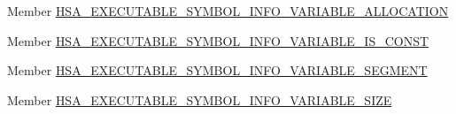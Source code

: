 \begin{DoxyRefList}
\item[Member \mbox{\hyperlink{group__executable_gga27e2e3a930764e3e7385e1ceded09706a7321c11fe73af65d09ef2718de8d1068}{HSA\+\_\+\+EXECUTABLE\+\_\+\+SYMBOL\+\_\+\+INFO\+\_\+\+VARIABLE\+\_\+\+ALLOCATION}} ]\label{deprecated__deprecated000084}%
%
 
\item[Member \mbox{\hyperlink{group__executable_gga27e2e3a930764e3e7385e1ceded09706a966dac196eeca9f48f1554c5f60b410d}{HSA\+\_\+\+EXECUTABLE\+\_\+\+SYMBOL\+\_\+\+INFO\+\_\+\+VARIABLE\+\_\+\+IS\+\_\+\+CONST}} ]\label{deprecated__deprecated000088}%
%
 
\item[Member \mbox{\hyperlink{group__executable_gga27e2e3a930764e3e7385e1ceded09706aa08f904d38d9ae932e16554353f40385}{HSA\+\_\+\+EXECUTABLE\+\_\+\+SYMBOL\+\_\+\+INFO\+\_\+\+VARIABLE\+\_\+\+SEGMENT}} ]\label{deprecated__deprecated000085}%
%
 
\item[Member \mbox{\hyperlink{group__executable_gga27e2e3a930764e3e7385e1ceded09706a060eddd4211e1537c84c26a3efabddb0}{HSA\+\_\+\+EXECUTABLE\+\_\+\+SYMBOL\+\_\+\+INFO\+\_\+\+VARIABLE\+\_\+\+SIZE}} ]\label{deprecated__deprecated000087}%
%
 

\end{DoxyRefList}
